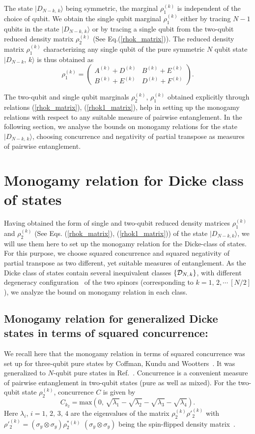 \documentclass[pra,a4paper,showpacs,superscriptaddress]{revtex4}
\newcommand{\be}{\begin{equation}}
\newcommand{\ee}{\end{equation}}
\newcommand{\ba}[1]{\left(\begin{array}{#1}}
\newcommand{\ea}{\end{array}\right)}
\begin{document}
The state $\vert D_{N-k,\,k}\rangle$  being symmetric, the marginal $\rho^{(k)}_1$ is independent of the choice of qubit. We obtain the single qubit marginal $\rho^{(k)}_1$ either by tracing $N-1$ qubits in the state $\vert D_{N-k,\,k}\rangle$ or by tracing a single qubit from the two-qubit reduced density matrix $\rho^{(k)}_2$ (See Eq.(\ref{rhok_matrix})). The reduced density matrix $\rho^{(k)}_1$ characterizing any single qubit of the pure symmetric $N$ qubit state $\vert D_{N-k},\, k\rangle$ is thus obtained as
\be
\label{rhok1_matrix}
\rho^{(k)}_1=\ba{cc}  A^{(k)}+D^{(k)}   & B^{(k)}+E^{(k)}  \\  B^{(k)}+E^{(k)}  &  D^{(k)}+F^{(k)} 
\ea.
\ee 

The two-qubit and single qubit marginals $\rho^{(k)}_2$, $\rho^{(k)}_1$ obtained explicitly through relations 
(\ref{rhok_matrix}),  (\ref{rhok1_matrix}), help in setting up the monogamy relations with respect to  any suitable measure of pairwise entanglement. In the following section, we analyse the bounds on monogamy relations for the state $\vert D_{N-k,\,k}\rangle$, choosing concurrence and negativity of partial transpose as measures of pairwise entanglement.

\section{Monogamy relation for Dicke class of states}

Having obtained the form of single and two-qubit reduced density matrices  $\rho^{(k)}_1$ and $\rho^{(k)}_2$ (See Eqs. (\ref{rhok_matrix}), 
(\ref{rhok1_matrix})) of the state $\vert D_{N-k, k}\rangle$, we will use them here to set up the monogamy relation for the Dicke-class of states. For this purpose, we choose squared concurrence and squared negativity of partial transpose as two different, yet  suitable measures of entanglement. As the Dicke class of states contain several inequivalent classes $\{{\cal{D}}_{N,\,k}\}$, with different degeneracy configuration~\cite{solano,bastin,usrmaj} of the two spinors (corresponding to $k=1,\,2,\cdots \ [N/2]$),  
we analyze the bound on monogamy relation in each class. 
\subsection{Monogamy relation for generalized Dicke states in terms of squared concurrence:} 

We recall here that the monogamy relation in terms of squared concurrence was set up for three-qubit pure states by Coffman, Kundu and 
Wootters~\cite{ckw}. It was generalized to $N$-qubit pure states in Ref.~\cite{osb}. Concurrence is a convenient measure of pairwise entanglement in two-qubit states (pure as well as mixed). For the two-qubit state $\rho^{(k)}_2$, concurrence $C$ is given by 
\[
C_{k_{2}}=\mbox{max}\left(0,\,\sqrt{\lambda_1}-\sqrt{\lambda_2}-\sqrt{\lambda_3}-\sqrt{\lambda_4} \right).
\] 
Here $\lambda_i$, $i=1,\,2,\,3,\,4$ are the  eigenvalues of the  matrix $\rho^{(k)}_2{\rho'^{(k)}_2}$ with 
${\rho'^{(k)}_2}=({\sigma}_{y}\otimes{\sigma}_{y}) \rho^{*}_2{^{(k)}}$ $({\sigma}_{y}\otimes{\sigma}_{y})$ being the spin-flipped density matrix~\cite{con1,con2}.  
\end{document}
